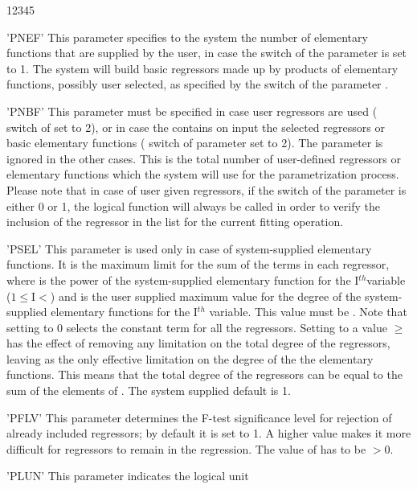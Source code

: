 \begin{DLtt}{12345}
\item['PNEF'] This parameter specifies to the system the number of
elementary functions that are supplied by the user, in case the switch
 of the  parameter is set to 1.
The system will build  basic
regressors made up by products of  elementary functions, possibly
user selected, as specified by the switch  of the parameter .
\item['PNBF'] This parameter must be specified in case user regressors are used
( switch of  set to 2), or in case the  contains
on input the selected regressors or basic elementary functions
( switch of  parameter set to 2).
The parameter is ignored in the other cases.
This is the total number of user-defined regressors or elementary functions
which the system will use for the parametrization process.
Please note that in case of user given regressors,
if the  switch of the  parameter is
either 0 or 1, the logical function 
will always be called
in order to verify the inclusion of the regressor 
in the list for the current fitting operation.
\item['PSEL'] This parameter is used only in case of system-supplied
elementary functions.
It is the maximum limit for the sum of the terms
 in each regressor, where  is the power
of the system-supplied elementary function for the I$^{th}$variable
($1\leq$I$<$) and  is the user supplied maximum
value for the degree of the system-supplied elementary functions for
the I$^{th}$ variable.
This value must be . Note that setting
 to 0 selects the constant term for all the regressors.
Setting  to a value $\geq$ has the effect of removing
any limitation on the total degree of the regressors, leaving 
as the only effective limitation on the degree of the the elementary functions.
This means that the total degree of the regressors can be equal to the sum of
the  elements of . The system supplied
default is 1.
\item['PFLV'] This parameter determines the F-test significance level for
rejection of already included regressors; by default it is set to 1.
A higher value makes it more difficult for regressors to remain in the regression. 
The value of  has to be $>0$.
\item['PLUN'] This parameter indicates the logical unit

\end{DLtt}
